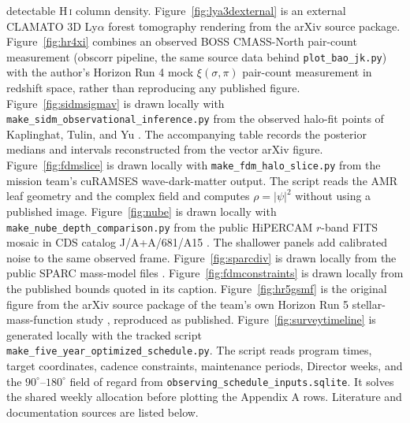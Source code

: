 detectable H\,\textsc{i} column density. Figure~\ref{fig:lya3dexternal} is an external CLAMATO 3D Ly$\alpha$ forest tomography rendering from the arXiv source package. Figure~\ref{fig:hr4xi} combines an observed BOSS CMASS-North pair-count measurement (obscorr pipeline, the same source data behind \texttt{plot\_bao\_jk.py}) with the author's Horizon Run 4 mock $\xi(\sigma,\pi)$ pair-count measurement in redshift space, rather than reproducing any published figure. Figure~\ref{fig:sidmsigmav} is drawn locally with \texttt{make\_sidm\_observational\_inference.py} from the observed halo-fit points of Kaplinghat, Tulin, and Yu \cite{kaplinghat2016}. The accompanying table records the posterior medians and intervals reconstructed from the vector arXiv figure. Figure~\ref{fig:fdmslice} is drawn locally with \texttt{make\_fdm\_halo\_slice.py} from the mission team's cuRAMSES wave-dark-matter output. The script reads the AMR leaf geometry and the complex field and computes $\rho=|\psi|^2$ without using a published image. Figure~\ref{fig:nube} is drawn locally with \texttt{make\_nube\_depth\_comparison.py} from the public HiPERCAM $r$-band FITS mosaic in CDS catalog J/A+A/681/A15 \cite{montes2024nube}. The shallower panels add calibrated noise to the same observed frame. Figure~\ref{fig:sparcdiv} is drawn locally from the public SPARC mass-model files \cite{lelli2016}. Figure~\ref{fig:fdmconstraints} is drawn locally from the published bounds quoted in its caption. Figure~\ref{fig:hr5gsmf} is the original figure from the arXiv source package of the team's own Horizon Run 5 stellar-mass-function study \cite{kim2023gsmf}, reproduced as published. Figure~\ref{fig:surveytimeline} is generated locally with the tracked script \texttt{make\_five\_year\_optimized\_schedule.py}. The script reads program times, target coordinates, cadence constraints, maintenance periods, Director weeks, and the $90^\circ$--$180^\circ$ field of regard from \texttt{observing\_schedule\_inputs.sqlite}. It solves the shared weekly allocation before plotting the Appendix A rows. Literature and documentation sources are listed below.

